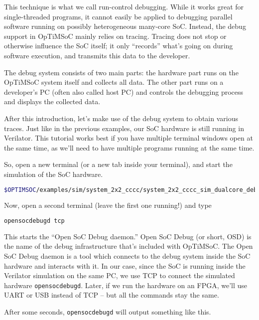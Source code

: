 This technique is what we call run-control debugging. While it works great for
single-threaded programs, it cannot easily be applied to debugging parallel
software running on possibly heterogeneous many-core SoC.
Instead, the debug support in OpTiMSoC mainly relies on tracing.
Tracing does not stop or otherwise influence the SoC itself; it only ``records'' what's going on during software execution, and transmits this data to the developer.

The debug system consists of two main parts: the hardware part runs on the
OpTiMSoC system itself and collects all data. The other part runs on a
developer's PC (often also called host PC) and controls the debugging process
and displays the collected data.

\medskip

After this introduction, let's make use of the debug system to obtain various traces.
Just like in the previous examples, our SoC hardware is still running in Verilator.
This tutorial works best if you have multiple terminal windows open at the same time, as we'll need to have multiple programs running at the same time.

So, open a new terminal (or a new tab inside your terminal), and start the simulation of the SoC hardware.
\begin{lstlisting}[language=sh]
$OPTIMSOC/examples/sim/system_2x2_cccc/system_2x2_cccc_sim_dualcore_debug
\end{lstlisting}

Now, open a second terminal (leave the first one running!) and type
\begin{lstlisting}[language=sh]
opensocdebugd tcp
\end{lstlisting}

This starts the ``Open SoC Debug daemon.''
Open SoC Debug (or short, OSD) is the name of the debug infrastructure that's included with OpTiMSoC.
The Open SoC Debug daemon is a tool which connects to the debug system inside the SoC hardware and interacts with it.
In our case, since the SoC is running inside the Verilator simulation on the same PC, we use TCP to connect the simulated hardware \verb|opensocdebugd|.
Later, if we run the hardware on an FPGA, we'll use UART or USB instead of TCP -- but all the commands stay the same.

After some seconds, \verb|opensocdebugd| will output something like this.

